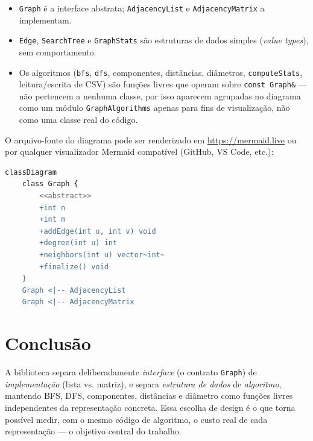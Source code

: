 \documentclass[a4paper,11pt]{article}
\begin{document}
\begin{itemize}
    \item \texttt{Graph} é a interface abstrata; \texttt{AdjacencyList} e
    \texttt{AdjacencyMatrix} a implementam.
    \item \texttt{Edge}, \texttt{SearchTree} e \texttt{GraphStats} são
    estruturas de dados simples (\emph{value types}), sem comportamento.
    \item Os algoritmos (\texttt{bfs}, \texttt{dfs}, componentes,
    distâncias, diâmetros, \texttt{computeStats}, leitura/escrita de
    CSV) são funções livres que operam sobre \texttt{const Graph\&} ---
    não pertencem a nenhuma classe, por isso aparecem agrupadas no
    diagrama como um módulo \texttt{GraphAlgorithms} apenas para fins de
    visualização, não como uma classe real do código.
\end{itemize}

O arquivo-fonte do diagrama pode ser renderizado em
\url{https://mermaid.live} ou por qualquer visualizador Mermaid
compatível (GitHub, VS Code, etc.):

\begin{lstlisting}[language=bash,numbers=none,caption={Trecho do diagrama de classes (ver docs/diagrama\_classes.mmd para o arquivo completo)}]
classDiagram
    class Graph {
        <<abstract>>
        +int n
        +int m
        +addEdge(int u, int v) void
        +degree(int u) int
        +neighbors(int u) vector~int~
        +finalize() void
    }
    Graph <|-- AdjacencyList
    Graph <|-- AdjacencyMatrix
\end{lstlisting}

\section{Conclusão}

A biblioteca separa deliberadamente \emph{interface} (o contrato
\texttt{Graph}) de \emph{implementação} (lista vs. matriz), e separa
\emph{estrutura de dados} de \emph{algoritmo}, mantendo BFS, DFS,
componentes, distâncias e diâmetro como funções livres independentes da
representação concreta. Essa escolha de design é o que torna possível
medir, com o mesmo código de algoritmo, o custo real de cada
representação --- o objetivo central do trabalho.
\end{document}
